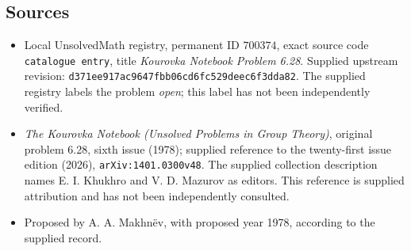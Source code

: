 \documentclass[11pt]{article}
\begin{document}
\subsection{Sources}
\begin{itemize}
\item Local UnsolvedMath registry, permanent ID \(700374\), exact source code \texttt{catalogue entry}, title \emph{Kourovka Notebook Problem 6.28}. Supplied upstream revision: \texttt{d371ee917ac9647fbb06cd6fc529deec6f3dda82}. The supplied registry labels the problem \emph{open}; this label has not been independently verified.
\item \emph{The Kourovka Notebook (Unsolved Problems in Group Theory)}, original problem 6.28, sixth issue (1978); supplied reference to the twenty-first issue edition (2026), \texttt{arXiv:1401.0300v48}. The supplied collection description names E. I. Khukhro and V. D. Mazurov as editors. This reference is supplied attribution and has not been independently consulted.
\item Proposed by A. A. Makhn\"ev, with proposed year 1978, according to the supplied record.
\end{itemize}
\end{document}
